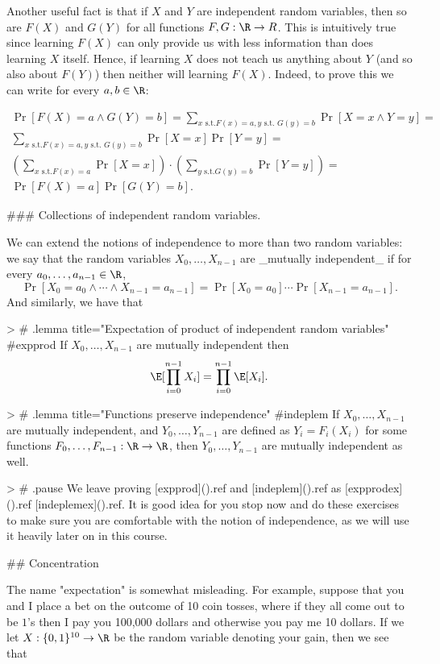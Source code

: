 Another useful fact is that if $X$ and $Y$ are independent random variables, then so are $F(X)$ and $G(Y)$ for all functions $F,G:\R \rightarrow R$.
This is intuitively true since learning $F(X)$ can only provide us with less information than does learning $X$ itself.
Hence, if learning $X$ does not teach us anything about $Y$ (and so also about $F(Y)$) then neither will learning $F(X)$.
Indeed, to prove this  we can write for every $a,b \in \R$:

$$
\begin{gathered}
\Pr[ F(X)=a \wedge G(Y)=b ] = \sum_{x \text{ s.t.} F(x)=a, y \text{ s.t. } G(y)=b} \Pr[ X=x \wedge Y=y ] = \\
\sum_{x \text{ s.t.} F(x)=a, y \text{ s.t. } G(y)=b} \Pr[ X=x ] \Pr[  Y=y ]  = \\
\left( \sum_{x \text{ s.t.} F(x)=a } \Pr[X=x ] \right) \cdot \left( \sum_{y \text{ s.t.} G(y)=b } \Pr[Y=y ] \right) = \\
\Pr[ F(X)=a] \Pr[G(Y)=b] .
\end{gathered}
$$

### Collections of independent random variables.

We can extend the notions of independence to more than two random variables:
we say that  the random variables $X_0,\ldots,X_{n-1}$ are _mutually independent_ if for every $a_0,\ldots,a_{n-1} \in \R$,
$$
\Pr\left[X_0=a_0 \wedge \cdots \wedge X_{n-1}=a_{n-1}\right]=\Pr[X_0=a_0]\cdots \Pr[X_{n-1}=a_{n-1}] .
$$
And similarly, we have that

> # {.lemma title="Expectation of product of independent random variables" #expprod}
If $X_0,\ldots,X_{n-1}$ are mutually independent then
$$
\E[ \prod_{i=0}^{n-1} X_i ] = \prod_{i=0}^{n-1} \E[X_i] .
$$

> # {.lemma title="Functions preserve independence" #indeplem}
If $X_0,\ldots,X_{n-1}$ are mutually independent, and $Y_0,\ldots,Y_{n-1}$ are defined as $Y_i = F_i(X_i)$ for some functions $F_0,\ldots,F_{n-1}:\R \rightarrow \R$, then $Y_0,\ldots,Y_{n-1}$ are mutually independent as well.

> # { .pause }
We leave proving [expprod](){.ref} and [indeplem](){.ref} as [expprodex](){.ref} [indeplemex](){.ref}.
It is  good idea for you stop now and do these exercises to make sure you are comfortable with the notion of independence, as we will use it heavily later on in this course.



## Concentration

The name "expectation" is somewhat misleading.
For example, suppose that you and I place a bet on the outcome of 10 coin tosses, where if they all come out to be $1$'s then  I pay you 100,000 dollars and otherwise you pay me 10 dollars.
If we let $X:\{0,1\}^{10} \rightarrow \R$ be the random variable denoting your gain, then we see that


